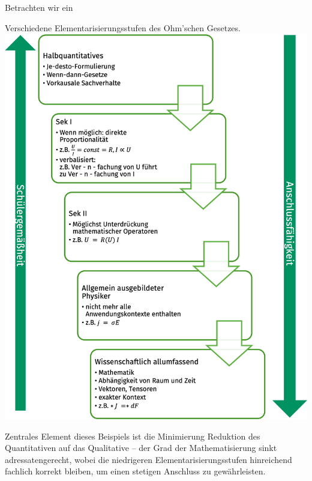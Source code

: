 Betrachten wir ein
\begin{beisp}
	Verschiedene Elementarisierungsstufen des Ohm'schen Gesetzes.
	\includegraphics[width=\textwidth]{Bilder/ohm}
	
	Zentrales Element dieses Beispiels ist die Minimierung Reduktion des Quantitativen auf das Qualitative -- der Grad der Mathematisierung sinkt adressatengerecht, wobei die niedrigeren Elementarisierungsstufen hinreichend fachlich korrekt bleiben, um einen stetigen Anschluss zu gewährleisten. 
\end{beisp}

